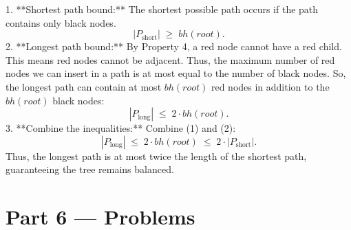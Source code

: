 \documentclass[12pt, a4paper]{book}
\begin{document}
\begin{problembox}
\begin{enumerate}[label=\textbf{E\arabic*.}]
        1. **Shortest path bound:**
           The shortest possible path occurs if the path contains only black nodes.
           \[
             |P_{\text{short}}| \;\ge\; bh(root).
           \]
        2. **Longest path bound:**
           By Property 4, a red node cannot have a red child. This means red nodes cannot be adjacent.
           Thus, the maximum number of red nodes we can insert in a path is at most equal to the number of black nodes.
           So, the longest path can contain at most $bh(root)$ red nodes in addition to the $bh(root)$ black nodes:
           \[
             |P_{\text{long}}| \;\le\; 2 \cdot bh(root).
           \]
        3. **Combine the inequalities:**
           Combine (1) and (2):
           \[
             |P_{\text{long}}| \;\le\; 2 \cdot bh(root) \;\le\; 2 \cdot |P_{\text{short}}|.
           \]
        Thus, the longest path is at most twice the length of the shortest path, guaranteeing the tree remains balanced.
\end{enumerate}
\end{problembox}

\newpage

\section{Part 6 --- Problems}
\end{document}
